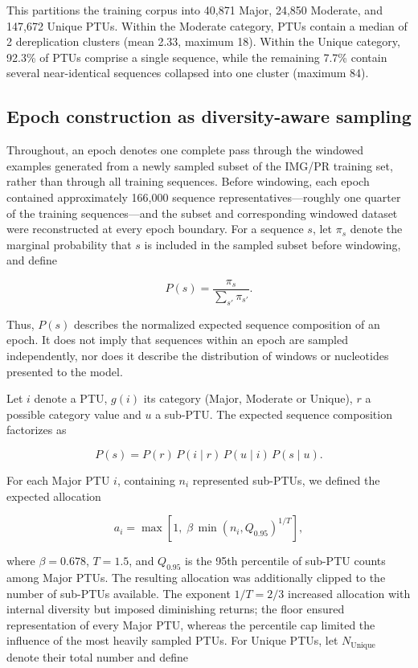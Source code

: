 This partitions the training corpus into 40,871 Major, 24,850 Moderate, and
147,672 Unique PTUs. Within the Moderate category, PTUs contain a median of 2
dereplication clusters (mean 2.33, maximum 18). Within the Unique category,
92.3\% of PTUs comprise a single sequence, while the remaining 7.7\% contain
several near-identical sequences collapsed into one cluster (maximum 84).


\subsection*{Epoch construction as diversity-aware sampling}

Throughout, an epoch denotes one complete pass through the windowed examples
generated from a newly sampled subset of the IMG/PR training set, rather than
through all training sequences. Before windowing, each epoch contained
approximately 166,000 sequence representatives---roughly one quarter of the
training sequences---and the subset and corresponding windowed dataset were
reconstructed at every epoch boundary. For a sequence \(s\), let \(\pi_s\)
denote the marginal probability that \(s\) is included in the sampled subset
before windowing, and define

\[
P(s)=\frac{\pi_s}{\sum_{s'}\pi_{s'}}.
\]

Thus, \(P(s)\) describes the normalized expected sequence composition of an
epoch. It does not imply that sequences within an epoch are sampled
independently, nor does it describe the distribution of windows or nucleotides
presented to the model.

Let \(i\) denote a PTU, \(g(i)\) its category (Major, Moderate or Unique), \(r\) a
possible category value and \(u\) a sub-PTU. The expected sequence composition
factorizes as

\[
P(s)=P(r)\,P(i\mid r)\,P(u\mid i)\,P(s\mid u).
\]

For each Major PTU \(i\), containing \(n_i\) represented sub-PTUs, we defined
the expected allocation

\[
a_i=
\max\!\left[
1,\;
\beta\,\min(n_i,Q_{0.95})^{1/T}
\right],
\]

where \(\beta=0.678\), \(T=1.5\), and \(Q_{0.95}\) is the 95th percentile of
sub-PTU counts among Major PTUs. The resulting allocation was additionally
clipped to the number of sub-PTUs available. The exponent \(1/T=2/3\) increased
allocation with internal diversity but imposed diminishing returns; the floor
ensured representation of every Major PTU, whereas the percentile cap limited
the influence of the most heavily sampled PTUs. For Unique PTUs, let
\(N_{\mathrm{Unique}}\) denote their total number and define

